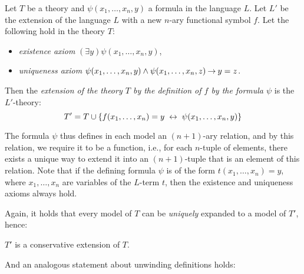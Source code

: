 \begin{definition}
    Let $T$ be a theory and $\psi(x_1,\dots,x_n,y)$ a formula in the language $L$. Let $L'$ be the extension of the language $L$ with a new $n$-ary functional symbol $f$. Let the following hold in the theory $T$:
    \begin{itemize}
        \item \emph{existence axiom} $(\exists y)\psi(x_1,\dots,x_n,y)$,
        \item \emph{uniqueness axiom} $\psi(x_1,\dots,x_n,y)\land \psi(x_1,\dots,x_n,z)\mathbin{\rightarrow} y=z$.
    \end{itemize}
    Then the \emph{extension of the theory $T$ by the definition of $f$ by the formula $\psi$} is the $L'$-theory:
    $$T'=T\cup\{f(x_1,\dots,x_n)=y\ \liff\ \psi(x_1,\dots,x_n,y)\}$$
\end{definition}

The formula $\psi$ thus defines in each model an $(n+1)$-ary relation, and by this relation, we require it to be a function, i.e., for each $n$-tuple of elements, there exists a unique way to extend it into an $(n+1)$-tuple that is an element of this relation. Note that if the defining formula $\psi$ is of the form $t(x_1,\dots,x_n)=y$, where $x_1,\dots,x_n$ are variables of the $L$-term $t$, then the existence and uniqueness axioms always hold.

Again, it holds that every model of $T$ can be \emph{uniquely} expanded to a model of $T'$, hence:
\begin{corollary}
    $T'$ is a conservative extension of $T$.
\end{corollary}

And an analogous statement about unwinding definitions holds:

